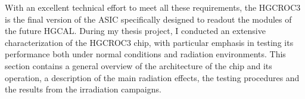 With an excellent technical effort to meet all these requirements, the HGCROC3 is the final version of the ASIC specifically designed to readout the modules of the future HGCAL. 
During my thesis project, I conducted an extensive characterization of the HGCROC3 chip, with particular emphasis in testing its performance both under normal conditions and radiation environments.
This section contains a general overview of the architecture of the chip and its operation, a description of the main radiation effects, the testing procedures and the results from the irradiation campaigns.
